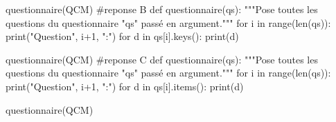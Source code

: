 \documentclass[a4paper,12,answers]{exam}
\begin{document}
\begin{questions}
\begin{solution}
\begin{pyconsole}
questionnaire(QCM)
#reponse B
def questionnaire(qs):
	"""Pose toutes les questions du questionnaire "qs" passé en argument."""
	for i in range(len(qs)):
		print("Question", i+1, ":")
		for d in  qs[i].keys():
			print(d)

questionnaire(QCM)	
#reponse C
def questionnaire(qs):
	"""Pose toutes les questions du questionnaire "qs" passé en argument."""
	for i in range(len(qs)):
		print("Question", i+1, ":")
		for d in  qs[i].items():
			print(d)

questionnaire(QCM)	
\end{pyconsole}
\end{solution}

\end{questions}	
\end{document}
